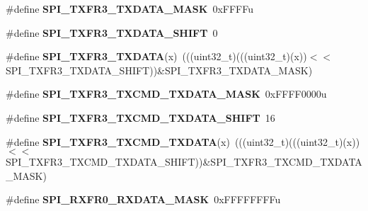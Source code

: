 \begin{DoxyCompactItemize}
\item 
\#define {\bfseries S\+P\+I\+\_\+\+T\+X\+F\+R3\+\_\+\+T\+X\+D\+A\+T\+A\+\_\+\+M\+A\+SK}~0x\+F\+F\+F\+Fu\hypertarget{group__SPI__Register__Masks_gac55f871f2a4bd1462049674e1b69d771}{}\label{group__SPI__Register__Masks_gac55f871f2a4bd1462049674e1b69d771}

\item 
\#define {\bfseries S\+P\+I\+\_\+\+T\+X\+F\+R3\+\_\+\+T\+X\+D\+A\+T\+A\+\_\+\+S\+H\+I\+FT}~0\hypertarget{group__SPI__Register__Masks_ga13d115127f0f26ef2f4afac9d4fcafd9}{}\label{group__SPI__Register__Masks_ga13d115127f0f26ef2f4afac9d4fcafd9}

\item 
\#define {\bfseries S\+P\+I\+\_\+\+T\+X\+F\+R3\+\_\+\+T\+X\+D\+A\+TA}(x)~(((uint32\+\_\+t)(((uint32\+\_\+t)(x))$<$$<$S\+P\+I\+\_\+\+T\+X\+F\+R3\+\_\+\+T\+X\+D\+A\+T\+A\+\_\+\+S\+H\+I\+FT))\&S\+P\+I\+\_\+\+T\+X\+F\+R3\+\_\+\+T\+X\+D\+A\+T\+A\+\_\+\+M\+A\+SK)\hypertarget{group__SPI__Register__Masks_ga49209a3863af39f655a385ddd5b917c4}{}\label{group__SPI__Register__Masks_ga49209a3863af39f655a385ddd5b917c4}

\item 
\#define {\bfseries S\+P\+I\+\_\+\+T\+X\+F\+R3\+\_\+\+T\+X\+C\+M\+D\+\_\+\+T\+X\+D\+A\+T\+A\+\_\+\+M\+A\+SK}~0x\+F\+F\+F\+F0000u\hypertarget{group__SPI__Register__Masks_ga5db2d61f529d80173f78729f46c098a9}{}\label{group__SPI__Register__Masks_ga5db2d61f529d80173f78729f46c098a9}

\item 
\#define {\bfseries S\+P\+I\+\_\+\+T\+X\+F\+R3\+\_\+\+T\+X\+C\+M\+D\+\_\+\+T\+X\+D\+A\+T\+A\+\_\+\+S\+H\+I\+FT}~16\hypertarget{group__SPI__Register__Masks_ga22a70393315807bfa3480a1892da3531}{}\label{group__SPI__Register__Masks_ga22a70393315807bfa3480a1892da3531}

\item 
\#define {\bfseries S\+P\+I\+\_\+\+T\+X\+F\+R3\+\_\+\+T\+X\+C\+M\+D\+\_\+\+T\+X\+D\+A\+TA}(x)~(((uint32\+\_\+t)(((uint32\+\_\+t)(x))$<$$<$S\+P\+I\+\_\+\+T\+X\+F\+R3\+\_\+\+T\+X\+C\+M\+D\+\_\+\+T\+X\+D\+A\+T\+A\+\_\+\+S\+H\+I\+FT))\&S\+P\+I\+\_\+\+T\+X\+F\+R3\+\_\+\+T\+X\+C\+M\+D\+\_\+\+T\+X\+D\+A\+T\+A\+\_\+\+M\+A\+SK)\hypertarget{group__SPI__Register__Masks_gabd1aff6c08d7a7334407f5a122fb2684}{}\label{group__SPI__Register__Masks_gabd1aff6c08d7a7334407f5a122fb2684}

\item 
\#define {\bfseries S\+P\+I\+\_\+\+R\+X\+F\+R0\+\_\+\+R\+X\+D\+A\+T\+A\+\_\+\+M\+A\+SK}~0x\+F\+F\+F\+F\+F\+F\+F\+Fu\hypertarget{group__SPI__Register__Masks_ga61ebb4d00d387b335d5b9d64d024e16f}{}\label{group__SPI__Register__Masks_ga61ebb4d00d387b335d5b9d64d024e16f}


\end{DoxyCompactItemize}
